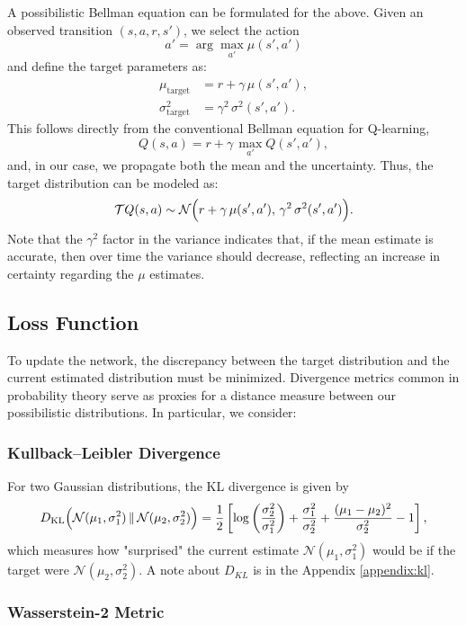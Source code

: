 \documentclass[12pt,a4paper]{report}
\begin{document}
A possibilistic Bellman equation can be formulated for the above. Given an observed transition \((s,a,r,s')\), we select the action 
\[
  a' = \arg\max_{a'} \mu(s', a')
\]
and define the target parameters as:
\begin{align*}
  \mu_{\text{target}} &= r + \gamma\,\mu(s', a'), \\
  \sigma^2_{\text{target}} &= \gamma^2\,\sigma^2(s', a').
\end{align*}
This follows directly from the conventional Bellman equation for Q-learning,
\[
  Q(s,a) = r + \gamma\,\max_{a'} Q(s', a'),
\]
and, in our case, we propagate both the mean and the uncertainty. Thus, the target distribution can be modeled as:
\[
  \mathcal{T}Q(s,a) \sim \mathcal{N}\Bigl(r + \gamma\,\mu(s', a'),\, \gamma^2\,\sigma^2(s', a')\Bigr).
\]
Note that the \(\gamma^2\) factor in the variance indicates that, if the mean estimate is accurate, then over time the variance should decrease, reflecting an increase in certainty regarding the \(\mu\) estimates.

\subsection{Loss Function}

To update the network, the discrepancy between the target distribution and the current estimated distribution must be minimized. Divergence metrics common in probability theory serve as proxies for a distance measure between our possibilistic distributions. In particular, we consider:

\subsubsection{Kullback--Leibler Divergence}

For two Gaussian distributions, the KL divergence is given by
\[
  D_{\mathrm{KL}} \Bigl( \mathcal{N}(\mu_1, \sigma_1^2) \,\|\, \mathcal{N}(\mu_2, \sigma_2^2) \Bigr)
  = \frac{1}{2} \left[
    \log \left( \frac{\sigma_2^2}{\sigma_1^2} \right) +
    \frac{\sigma_1^2}{\sigma_2^2} +
    \frac{(\mu_1 - \mu_2)^2}{\sigma_2^2} - 1
  \right],
\]
which measures how "surprised" the current estimate \(\mathcal{N}(\mu_1, \sigma_1^2)\) would be if the target were \(\mathcal{N}(\mu_2, \sigma_2^2)\). A note about $D_{KL}$ is in the Appendix \ref{appendix:kl}.
\subsubsection{Wasserstein-2 Metric}
\end{document}
